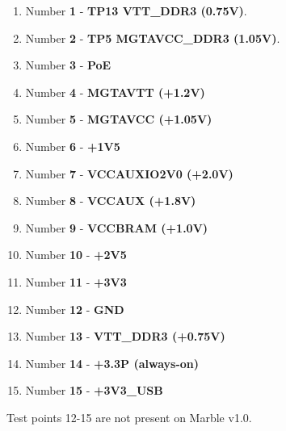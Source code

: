 \documentclass[12pt,oneside,a4]{article}
\begin{document}
\begin{enumerate}[label=(\alph*)]
	\item Number \textbf{1} - \textbf{TP13 VTT\_DDR3 (0.75V)}.
	\item Number \textbf{2} - \textbf{TP5 MGTAVCC\_DDR3 (1.05V)}.
	\item Number \textbf{3} - \textbf{PoE}
	\item Number \textbf{4} - \textbf{MGTAVTT (+1.2V)}
	\item Number \textbf{5} - \textbf{MGTAVCC (+1.05V)}
	\item Number \textbf{6} - \textbf{+1V5}
	\item Number \textbf{7} - \textbf{VCCAUXIO2V0 (+2.0V)}
	\item Number \textbf{8} - \textbf{VCCAUX (+1.8V)}
	\item Number \textbf{9} - \textbf{VCCBRAM (+1.0V)}
	\item Number \textbf{10} - \textbf{+2V5}
	\item Number \textbf{11} - \textbf{+3V3}
	\item Number \textbf{12} - \textbf{GND}
	\item Number \textbf{13} - \textbf{VTT\_DDR3 (+0.75V)}
	\item Number \textbf{14} - \textbf{+3.3P (always-on)}
	\item Number \textbf{15} - \textbf{+3V3\_USB}

\end{enumerate}

Test points 12-15 are not present on Marble v1.0.

\begin{thebibliography}{99}
\end{thebibliography}
\end{document}
